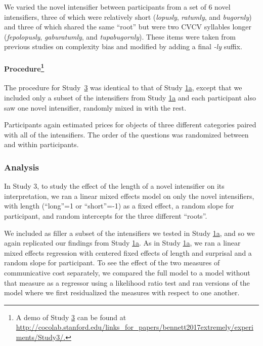 \documentclass[10pt,letterpaper]{article}
\newcommand{\w}[1]{\emph{#1}}
\begin{document}
We varied the novel intensifier between participants from a set of 6 novel intensifiers, three of which were relatively short (\w{lopusly}, \w{ratumly}, and \w{bugornly}) and three of which shared the same ``root'' but were two CVCV syllables longer (\w{fepolopusly}, \w{gaburatumly}, and \w{tupabugornly}).
These items were taken from previous studies on complexity bias \cite{lewis_conceptual_2016} and modified by adding a final \w{-ly} suffix.

\paragraph{Procedure\footnote{A demo of Study \hyperref[sec:study3]{3} can be found at \url{http://cocolab.stanford.edu/links_for_papers/bennett2017extremely/experiments/Study3/.}}}

The procedure for Study~\hyperref[sec:study3]{3} was identical to that of Study \hyperref[sec:study1a]{1a}, except that we included only a subset of the intensifiers from Study \hyperref[sec:study1a]{1a} and each participant also saw one novel intensifier, randomly mixed in with the rest.

Participants again estimated prices for objects of three different categories paired with all of the intensifiers.
The order of the questions was randomized between and within participants.

\subsubsection{Analysis}

In Study 3,  to study the effect of the length of a novel intensifier on its interpretation, we ran a linear mixed effects model on only the novel intensifiers, with length (``long''=1 or ``short''=-1) as a fixed effect, a random slope for participant, and random intercepts for the three different ``roots''.

We included as filler a subset of the intensifiers we tested in Study \hyperref[sec:study1a]{1a}, and so we again replicated our findings from Study \hyperref[sec:study1a]{1a}.
As in Study \hyperref[sec:study1a]{1a}, we ran a linear mixed effects regression with centered fixed effects of length and surprisal and a random slope for participant.
%
To see the effect of the two measures of communicative cost separately, we compared the full model to a model without that measure as a regressor using a likelihood ratio test and ran versions of the model where we first residualized the measures with respect to one another.
\end{document}
